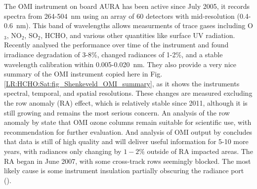       The OMI instrument on board AURA has been active since July 2005, it records spectra from 264-504~nm using an array of 60 detectors with mid-resolution (0.4-0.6~nm).
      This band of wavelengths allows measurments of trace gases including O$_3$, NO$_2$, SO$_2$, HCHO, and various other quantities like surface UV radiation.
      Recently \textcite{Schenkeveld2017} analysed the performance over time of the instrument and found irradiance degradation of 3-8\%, changed radiances of 1-2\%, and a stable wavelength calibration within 0.005-0.020~nm.
      They also provide a very nice summary of the OMI instrument copied here in Fig. \ref{LR:HCHO:Sat:fig_Shenkeveld_OMI_summary}, as it shows the instruments spectral, temporal, and spatial resolutions.
      These changes are measured excluding the row anomaly (RA) effect, which is relatively stable since 2011, although it is still growing and remains the most serious concern.
      An analysis of the row anomaly by \textcite{Huang2017} state that OMI ozone columns remain suitable for scientific use, with recommendation for further evaluation.
      And analysis of OMI output by \textcite{Schenkeveld2017} concludes that data is still of high quality and will deliver useful information for 5-10 more years, with radiances only changing by $1-2\%$ outside of RA impacted areas.
      The RA began in June 2007, with some cross-track rows seemingly blocked. The most likely cause is some instrument insulation partially obscuring the radiance port (\textcite{Schenkeveld2017}).
      
